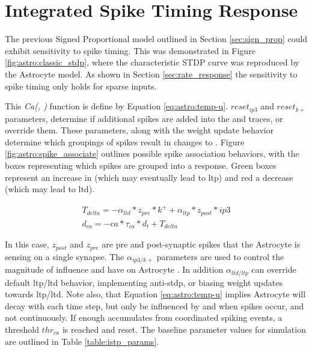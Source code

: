 \section{Integrated Spike Timing Response} \label{section:istp}
 The previous Signed Proportional model outlined in Section
\ref{sec:sign_prop} could exhibit sensitivity to spike timing. This was
demonstrated in Figure \ref{fig:astro:classic_stdp}, where the characteristic
STDP curve was reproduced by the Astrocyte model. As shown in Section
\ref{sec:rate_response} the sensitivity to spike timing only holds for sparse
inputs.

This \emph{Ca(\ipt, \kp)} function is define by Equation
\ref{eq:astro:temp-u}. $reset_{ip3}$ and $reset_{k+}$ parameters, determine if
additional spikes are added into the \ipt and \kp traces, or override
them. These parameters, along with the weight update behavior determine which
groupings of spikes result in changes to \ca. Figure
\ref{fig:astro:spike_associate} outlines possible spike association
behaviors, with the boxes representing which spikes are grouped into a \ca
response. Green boxes represent an increase in \ca (which may eventually lead to
\gls{ltp}) and red a decrease (which may lead to \gls{ltd}).



\begin{align}
T_{delta} = -\alpha_{ltd} * z_{pre} * k^+ + \alpha_{ltp} * z_{post} * ip3 \\
d_{ca} = -ca * \tau_{ca} * d_t + T_{delta} \label{eq:astro:temp-u}
\end{align}

In this case, $z_{post}$ and $z_{pre}$ are pre and post-synaptic spikes that
the Astrocyte is sensing on a single synapse. The $\alpha_{ip3/k+}$ parameters
are used to control the magnitude of influence \ipt and \kp have on Astrocyte
\ca. In addition $\alpha_{ltd/ltp}$ can override default \Gls{ltp}/\Gls{ltd} behavior,
implementing anti-stdp, or biasing weight updates towards \Gls{ltp}/\Gls{ltd}. Note also,
that Equation \ref{eq:astro:temp-u} implies Astrocyte \ca will decay with each
time step, but only be influenced by \ipt and \kp when spikes occur, and
not continuously. If enough \ca accumulates from coordinated spiking events, a
threshold $thr_{ca}$ is reached and \ca reset. The baseline parameter values
for simulation are outlined in Table \ref{table:istp_params}.

